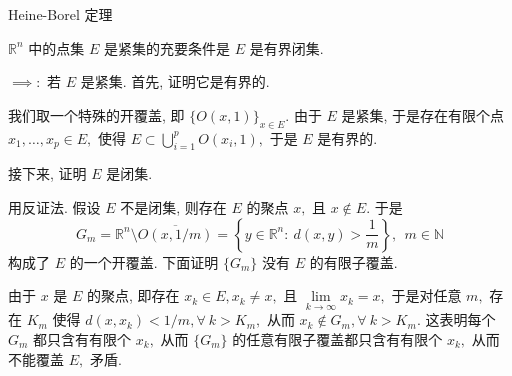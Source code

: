 
\begin{frame}{Heine-Borel 定理}

\begin{thm}
$\mathbb{R}^n$ 中的点集 $E$ 是紧集的充要条件是 $E$ 是有界闭集.
\end{thm}

\pause
\vspace{0.5em}

\startproof[bg=yellow, fg=red]
\vspace{0.5em}

$\implies:$ 若 $E$ 是紧集. 首先, 证明它是有界的.

\pause

我们取一个特殊的开覆盖, 即 $\{ O(x, 1) \}_{x \in E}.$ 由于 $E$ 是紧集, 于是存在有限个点 $x_1, \dots, x_p \in E,$ 使得 $E \subset \bigcup\limits_{i=1}^p O(x_i, 1),$ 于是 $E$ 是有界的.

\pause
\vspace{0.5em}

接下来, 证明 $E$ 是闭集.

\pause

用反证法. 假设 $E$ 不是闭集, 则存在 $E$ 的聚点 $x,$ 且 $x \not\in E.$ 于是
\[G_m = \mathbb{R}^n \setminus \overline{O(x, 1/m)} = \left\{ y \in \mathbb{R}^n: ~ d(x, y) > \dfrac{1}{m} \right\}, ~~ m \in \mathbb{N}\]
构成了 $E$ 的一个开覆盖. 下面证明 $\{ G_m \}$ 没有 $E$ 的有限子覆盖.

\pause

由于 $x$ 是 $E$ 的聚点, 即存在 $x_k \in E, x_k \neq x,$ 且 $\lim\limits_{k\to\infty} x_k = x,$ 于是对任意 $m,$ 存在 $K_m$ 使得 $d(x, x_k) < 1/m, \forall~k > K_m,$ 从而 $x_k \not\in G_m, \forall~k > K_m.$ 这表明每个 $G_m$ 都只含有有限个 $x_k,$ 从而 $\{ G_m \}$ 的任意有限子覆盖都只含有有限个 $x_k,$ 从而不能覆盖 $E,$ 矛盾.

\end{frame}


